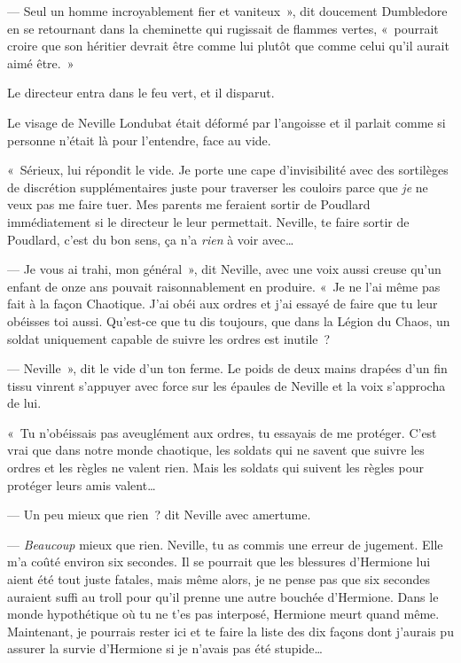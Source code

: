 --- Seul un homme incroyablement fier et vaniteux~», dit doucement Dumbledore en se retournant dans la cheminette qui rugissait de flammes vertes, «~pourrait croire que son héritier devrait être comme lui plutôt que comme celui qu'il aurait aimé être.~»

Le directeur entra dans le feu vert, et il disparut.


Le visage de Neville Londubat était déformé par l'angoisse et il parlait comme si personne n'était là pour l'entendre, face au vide.

«~Sérieux, lui répondit le vide. Je porte une cape d'invisibilité avec des sortilèges de discrétion supplémentaires juste pour traverser les couloirs parce que \emph{je} ne veux pas me faire tuer. Mes parents me feraient sortir de Poudlard immédiatement si le directeur le leur permettait. Neville, te faire sortir de Poudlard, c'est du bon sens, ça n'a \emph{rien} à voir avec…

--- Je vous ai trahi, mon général~», dit Neville, avec une voix aussi creuse qu'un enfant de onze ans pouvait raisonnablement en produire. «~Je ne l'ai même pas fait à la façon Chaotique. J'ai obéi aux ordres et j'ai essayé de faire que tu leur obéisses toi aussi. Qu'est-ce que tu dis toujours, que dans la Légion du Chaos, un soldat uniquement capable de suivre les ordres est inutile~?

--- Neville~», dit le vide d'un ton ferme. Le poids de deux mains drapées d'un fin tissu vinrent s'appuyer avec force sur les épaules de Neville et la voix s'approcha de lui.

«~Tu n'obéissais pas aveuglément aux ordres, tu essayais de me protéger. C'est vrai que dans notre monde chaotique, les soldats qui ne savent que suivre les ordres et les règles ne valent rien. Mais les soldats qui suivent les règles pour protéger leurs amis valent…

--- Un peu mieux que rien~? dit Neville avec amertume.

--- \emph{Beaucoup} mieux que rien. Neville, tu as commis une erreur de jugement. Elle m'a coûté environ six secondes. Il se pourrait que les blessures d'Hermione lui aient été tout juste fatales, mais même alors, je ne pense pas que six secondes auraient suffi au troll pour qu'il prenne une autre bouchée d'Hermione. Dans le monde hypothétique où tu ne t'es pas interposé, Hermione meurt quand même. Maintenant, je pourrais rester ici et te faire la liste des dix façons dont j'aurais pu assurer la survie d'Hermione si je n'avais pas été stupide…

